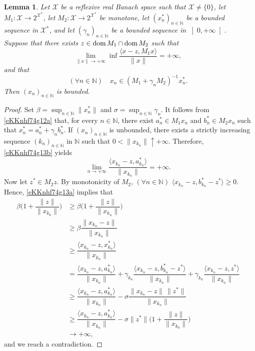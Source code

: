 \documentclass[a4paper,11pt,fleqn]{article}
\renewcommand{\geq}{\ensuremath{\geqslant}}
\newcommand{\pair}[2]{\langle{{#1},{#2}}\rangle}
\newcommand{\XX}{\ensuremath{{\mathcal X}}}
\newcommand{\RPP}{\ensuremath{\left]0,+\infty\right[}}
\newcommand{\NN}{\ensuremath{\mathbb N}}
\newcommand{\pinf}{\ensuremath{{+\infty}}}
\newcommand{\dom}{\ensuremath{\text{\rm dom}\,}}
\newtheorem{lemma}[theorem]{Lemma}
\theoremstyle{plain}{\theorembodyfont{\rmfamily}%
\newtheorem{conjecture}[theorem]{Conjecture}}
\theoremstyle{plain}{\theorembodyfont{\rmfamily}%
\newtheorem{example}[theorem]{Example}}
\theoremstyle{plain}{\theorembodyfont{\rmfamily}%
\newtheorem{remark}[theorem]{Remark}}
\theoremstyle{plain}{\theorembodyfont{\rmfamily}%
\newtheorem{algorithm}[theorem]{Algorithm}}
\theoremstyle{plain}{\theorembodyfont{\rmfamily}%
\newtheorem{condition}[theorem]{Condition}}
\theoremstyle{plain}{\theorembodyfont{\rmfamily}%
\newtheorem{definition}[theorem]{Definition}}
\theoremstyle{plain}{\theorembodyfont{\rmfamily}
\newtheorem{problem}[theorem]{Problem}}
\theoremstyle{plain}{\theorembodyfont{\rmfamily}
\newtheorem{notation}[theorem]{Notation}}
\numberwithin{equation}{section}
\begin{document}
\begin{lemma}
\label{IVlKKnhf74g12}
Let $\XX$ be a reflexive real Banach space such that 
$\XX\neq\{0\}$, let $M_1\colon\XX\to 2^{\XX^*}$, let 
$M_2\colon\XX\to 2^{\XX^*}$ be monotone, let $(x_n^*)_{n\in\NN}$ 
be a bounded sequence in $\XX^*$, and let $(\gamma_n)_{n\in\NN}$ 
be a bounded sequence in $\RPP$. Suppose that there exists 
$z\in\dom M_1\cap\dom M_2$ such that
\begin{equation}
\label{eKKnhf74g13b}
\lim_{\|x\|\to+\infty}\inf\dfrac{\pair{x-z}{M_1x}}{\|x\|}=\pinf,
\end{equation} 
and that
\begin{equation}
\label{eKKnhf74g12a}
(\forall n\in\NN)\quad x_n\in(M_1+\gamma_n M_2)^{-1}x_n^*.
\end{equation}
Then $(x_n)_{n\in\NN}$ is bounded.
\end{lemma}
\begin{proof}
Set $\beta=\sup_{n\in\NN}\|x_n^*\|$ and 
$\sigma=\sup_{n\in\NN}\gamma_n$. It follows from
\eqref{eKKnhf74g12a} that, for every $n\in\NN$, there exist
$a_n^*\in M_1x_n$ and $b_n^*\in M_2x_n$ such that
$x_n^*=a_n^*+\gamma_n b_n^*$. If $(x_n)_{n\in\NN}$ is  
unbounded, there exists a strictly increasing sequence 
$(k_n)_{n\in\NN}$ in $\NN$ such that $0<\|x_{k_n}\|\uparrow\pinf$.
Therefore, \eqref{eKKnhf74g13b} yields
\begin{equation}
\label{eKKnhf74g13a}
\lim_{n\to\pinf}
\dfrac{\pair{x_{k_n}-z}{a^*_{k_n}}}{\|x_{k_n}\|}=\pinf.
\end{equation} 
Now let $z^*\in M_2 z$. By monotonicity of $M_2$,
$(\forall n\in\NN)$ $\pair{x_{k_n}-z}{b_{k_n}^*-z^*}\geq 0$.
Hence, \eqref{eKKnhf74g13a} implies that
\begin{align}
\label{eKKnhf74g12b}
\beta\bigg(1+\dfrac{\|z\|}{\|x_{k_0}\|}\bigg)
&\geq\beta\bigg(1+\dfrac{\|z\|}{\|x_{k_n}\|}\bigg)\nonumber\\
&\geq\beta\dfrac{\|x_{k_n}-z\|}{\|x_{k_n}\|}\nonumber\\
&\geq\dfrac{\pair{x_{k_n}-z}{x_{k_n}^*}}{\|x_{k_n}\|}\nonumber\\
&=\dfrac{\pair{x_{k_n}-z}{a_{k_n}^*}}{\|x_{k_n}\|}
+\gamma_{k_n}\dfrac{\pair{x_{k_n}-z}{b_{k_n}^*-z^*}}{\|x_{k_n}\|}
+\gamma_{k_n}\dfrac{\pair{x_{k_n}-z}{z^*}}{\|x_{k_n}\|}\nonumber\\
&\geq\dfrac{\pair{x_{k_n}-z}{a_{k_n}^*}}{\|x_{k_n}\|}
-\sigma\dfrac{\|x_{k_n}-z\|\,\|z^*\|}{\|x_{k_n}\|}\nonumber\\
&\geq\dfrac{\pair{x_{k_n}-z}{a_{k_n}^*}}{\|x_{k_n}\|}
-\sigma\|z^*\|\bigg(1+\dfrac{\|z\|}{\|x_{k_0}\|}\bigg)\nonumber\\
&\to\pinf,
\end{align}
and we reach a contradiction.
\end{proof}
\end{document}
